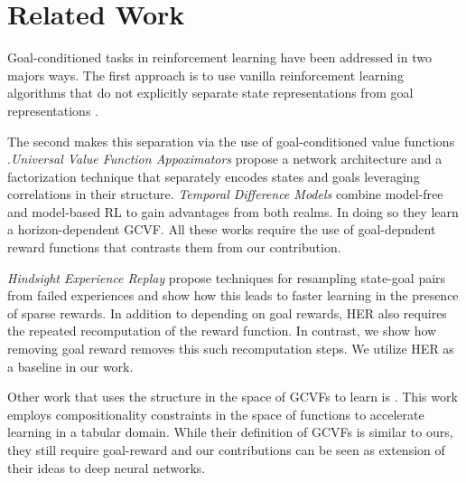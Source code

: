 \section{Related Work}

Goal-conditioned tasks in reinforcement learning have been addressed in
two majors ways. The first approach is to use vanilla reinforcement
learning algorithms that do not explicitly separate state
representations from goal representations
\citep{mirowski2016learning,dosovitskiy2016learning,gupta2017cognitive,parisotto2017neural,mirowski2018learning}. 

The second makes this separation via the use of goal-conditioned value
functions \citep{foster2002structure,sutton2011horde}.\emph{Universal
Value Function Appoximators} \cite{schaul2015universal} propose a
network architecture and a factorization technique that separately
encodes states and goals leveraging correlations in their structure.
\emph{Temporal Difference Models} combine model-free
and model-based RL to gain advantages from both realms. In doing so they
learn a horizon-dependent GCVF. All these works require the use of
goal-depndent reward functions that contrasts them from our
contribution. 

\emph{Hindsight Experience Replay} \cite{andrychowicz2017hindsight}
propose techniques for resampling state-goal pairs from failed
experiences and show how this leads to faster learning in the presence
of sparse rewards. In addition to depending on goal rewards, HER also
requires the repeated recomputation of the reward function. In contrast,
we show how removing goal reward removes this such recomputation steps.
We utilize HER as a baseline in our work. 


Other work that uses the structure in the space of GCVFs to learn is
\citet{dhiman2018floydwarshall}. This work employs compositionality
constraints in the space of functions to accelerate learning in a
tabular domain. While their definition of GCVFs is similar to ours, they
still require goal-reward and our contributions can be
seen as extension of their ideas to deep neural networks. 


